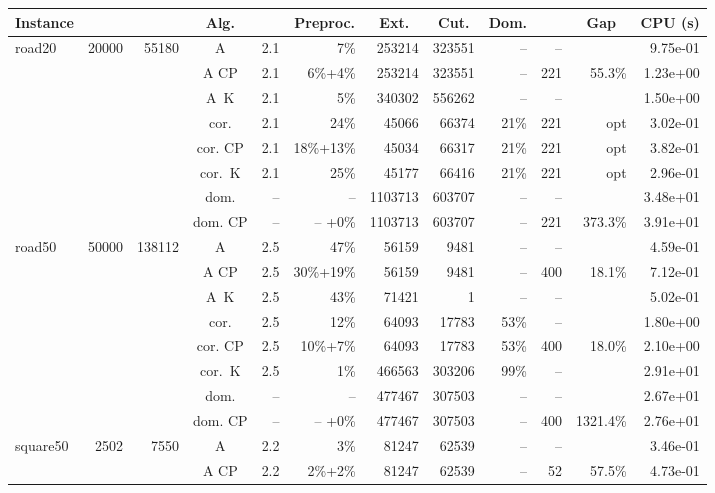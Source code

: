 \documentclass[11pt]{amsart}
\newenvironment{outdent}
{\begin{list}{}{\leftmargin-2cm\rightmargin\leftmargin}\centering\item\relax}
{\end{list}\ignorespacesafterend}
\theoremstyle{plain}
\theoremstyle{remark}
\begin{document}
\begin{table}
\begin{outdent}
\begin{footnotesize}
\begin{tabular}{|l|rrc|rr|rrr|rr|r|}
\hline
Instance 
& \multicolumn{1}{c}{} 
& \multicolumn{1}{c}{} 
& \multicolumn{1}{c|}{Alg.} 
& \multicolumn{1}{c}{} 
& \multicolumn{1}{c|}{Preproc.} 
& \multicolumn{1}{c}{Ext.} 
& \multicolumn{1}{c}{Cut.} 
& \multicolumn{1}{c|}{Dom.} 
& \multicolumn{1}{c}{} 
& \multicolumn{1}{c|}{Gap} 
& \multicolumn{1}{c|}{CPU (s)} \\
\hline
road20 & 20000 & 55180 & A & 2.1 & 7\% &253214 & 323551 & -- & -- & & 9.75e-01 \\
&&&A CP & 2.1 & 6\%+4\% &253214 & 323551 & -- &221 & 55.3\% & 1.23e+00 \\
&&&A~K & 2.1 & 5\% &340302 & 556262 & -- & -- & & 1.50e+00 \\
&&&cor. & 2.1 & 24\% &45066 & 66374 & 21\% &221 & opt & 3.02e-01 \\
&&&cor. CP & 2.1 & 18\%+13\% &45034 & 66317 & 21\% &221 & opt & 3.82e-01 \\
&&&cor.~K & 2.1 & 25\% &45177 & 66416 & 21\% &221 & opt & 2.96e-01 \\
&&&dom. & -- & --  &1103713 & 603707 & -- & -- & & 3.48e+01 \\
&&&dom. CP & -- & -- +0\% &1103713 & 603707 & -- &221 & 373.3\% & 3.91e+01 \\
\hline
road50 & 50000 & 138112 & A & 2.5 & 47\% &56159 & 9481 & -- & -- & & 4.59e-01 \\
&&&A CP & 2.5 & 30\%+19\% &56159 & 9481 & -- &400 & 18.1\% & 7.12e-01 \\
&&&A~K & 2.5 & 43\% &71421 & 1 & -- & -- & & 5.02e-01 \\
&&&cor. & 2.5 & 12\% &64093 & 17783 & 53\% & -- & & 1.80e+00 \\
&&&cor. CP & 2.5 & 10\%+7\% &64093 & 17783 & 53\% &400 & 18.0\% & 2.10e+00 \\
&&&cor.~K & 2.5 & 1\% &466563 & 303206 & 99\% & -- & & 2.91e+01 \\
&&&dom. & -- & --  &477467 & 307503 & -- & -- & & 2.67e+01 \\
&&&dom. CP & -- & -- +0\% &477467 & 307503 & -- &400 & 1321.4\% & 2.76e+01 \\
\hline
square50 & 2502 & 7550 & A & 2.2 & 3\% &81247 & 62539 & -- & -- & & 3.46e-01 \\
&&&A CP & 2.2 & 2\%+2\% &81247 & 62539 & -- &52 & 57.5\% & 4.73e-01 \\

\end{tabular}
\end{footnotesize}
\end{outdent}
\end{table}
\end{document}
